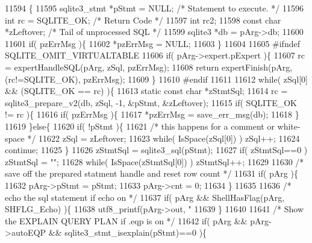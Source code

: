 \begin{DoxyCode}
11594  \{
11595   sqlite3_stmt *pStmt = NULL;     \textcolor{comment}{/* Statement to execute. */}
11596   \textcolor{keywordtype}{int} rc = SQLITE_OK;             \textcolor{comment}{/* Return Code */}
11597   \textcolor{keywordtype}{int} rc2;
11598   \textcolor{keyword}{const} \textcolor{keywordtype}{char} *zLeftover;          \textcolor{comment}{/* Tail of unprocessed SQL */}
11599   sqlite3 *db = pArg->db;
11600 
11601   \textcolor{keywordflow}{if}( pzErrMsg )\{
11602     *pzErrMsg = NULL;
11603   \}
11604 
11605 \textcolor{preprocessor}{#ifndef SQLITE\_OMIT\_VIRTUALTABLE}
11606   \textcolor{keywordflow}{if}( pArg->expert.pExpert )\{
11607     rc = expertHandleSQL(pArg, zSql, pzErrMsg);
11608     \textcolor{keywordflow}{return} expertFinish(pArg, (rc!=SQLITE_OK), pzErrMsg);
11609   \}
11610 \textcolor{preprocessor}{#endif}
11611 
11612   \textcolor{keywordflow}{while}( zSql[0] && (SQLITE_OK == rc) )\{
11613     \textcolor{keyword}{static} \textcolor{keyword}{const} \textcolor{keywordtype}{char} *zStmtSql;
11614     rc = sqlite3_prepare_v2(db, zSql, -1, &pStmt, &zLeftover);
11615     \textcolor{keywordflow}{if}( SQLITE_OK != rc )\{
11616       \textcolor{keywordflow}{if}( pzErrMsg )\{
11617         *pzErrMsg = save_err_msg(db);
11618       \}
11619     \}\textcolor{keywordflow}{else}\{
11620       \textcolor{keywordflow}{if}( !pStmt )\{
11621         \textcolor{comment}{/* this happens for a comment or white-space */}
11622         zSql = zLeftover;
11623         \textcolor{keywordflow}{while}( IsSpace(zSql[0]) ) zSql++;
11624         \textcolor{keywordflow}{continue};
11625       \}
11626       zStmtSql = sqlite3_sql(pStmt);
11627       \textcolor{keywordflow}{if}( zStmtSql==0 ) zStmtSql = \textcolor{stringliteral}{""};
11628       \textcolor{keywordflow}{while}( IsSpace(zStmtSql[0]) ) zStmtSql++;
11629 
11630       \textcolor{comment}{/* save off the prepared statment handle and reset row count */}
11631       \textcolor{keywordflow}{if}( pArg )\{
11632         pArg->pStmt = pStmt;
11633         pArg->cnt = 0;
11634       \}
11635 
11636       \textcolor{comment}{/* echo the sql statement if echo on */}
11637       \textcolor{keywordflow}{if}( pArg && ShellHasFlag(pArg, SHFLG_Echo) )\{
11638         utf8_printf(pArg->out, \textcolor{stringliteral}{"%
11639       \}
11640 
11641       \textcolor{comment}{/* Show the EXPLAIN QUERY PLAN if .eqp is on */}
11642       \textcolor{keywordflow}{if}( pArg && pArg->autoEQP && sqlite3_stmt_isexplain(pStmt)==0 )\{
}
\end{DoxyCode}
